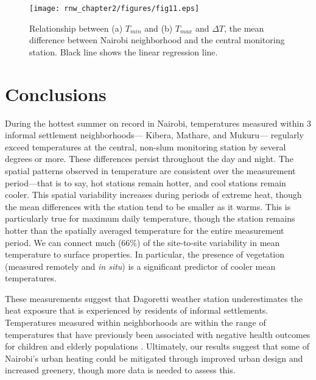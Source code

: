 \begin{figure}
\texttt{[image: rnw\_chapter2/figures/fig11.eps]}
\caption{%
Relationship between (a) $T_{min}$ and (b) $T_{max}$ and $\Delta T$, the mean difference between Nairobi neighborhood and the central monitoring station. Black line shows the linear regression line.}
\label{hw}
\end{figure}


\section{Conclusions}

During the hottest summer on record in Nairobi, temperatures measured within 3 informal settlement neighborhoods--- Kibera, Mathare, and Mukuru---  regularly exceed temperatures at the central, non-slum monitoring station by several degrees or more. These differences persist throughout the day and night.  The spatial patterns observed in temperature are consistent over the measurement period---that is to say, hot stations remain hotter, and cool stations remain cooler. This spatial variability increases during periods of extreme heat, though the mean differences with the station tend to be smaller as it warms. This is particularly true for maximum daily temperature, though the station remains hotter than the spatially averaged temperature for the entire measurement period. We can connect much (66\%) of the site-to-site variability in mean temperature to surface properties. In particular, the presence of vegetation (measured remotely and \textit{in situ}) is a significant predictor of cooler mean temperatures.

These measurements suggest that Dagoretti weather station underestimates the heat exposure that is experienced by residents of informal settlements. 
Temperatures measured within neighborhoods are within the range of temperatures that have previously been associated with negative health outcomes for children and elderly populations \cite{egondi2012}.
Ultimately, our results suggest that some of Nairobi's urban heating could be mitigated through improved urban design and increased greenery, though more data is needed to assess this. %

